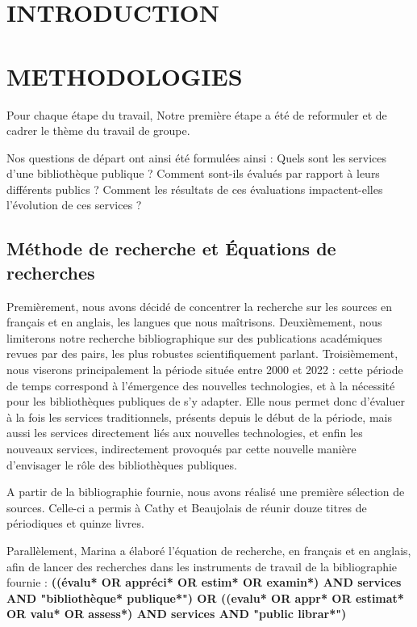 \documentclass[french,a4paper,12pt]{article}
\begin{document}
 \begin{center}
 \tableofcontents
 \end{center}
\newpage



\section{INTRODUCTION}




\newpage
\section{METHODOLOGIES}
Pour chaque étape du travail,  
Notre première étape a été de reformuler et de cadrer le thème du travail de groupe. 

\quad Nos questions de départ ont ainsi été formulées ainsi : Quels sont les services d'une bibliothèque publique ? Comment sont-ils évalués par rapport à leurs différents publics ? Comment les résultats de ces évaluations impactent-elles l'évolution de ces services ?\\
 
\subsection{Méthode de recherche​ et Équations de recherches}
\quad Premièrement, nous avons décidé de concentrer la recherche sur les sources en français et en anglais, les langues que nous maîtrisons. Deuxièmement, nous limiterons notre recherche bibliographique sur des publications académiques revues par des pairs, les plus robustes scientifiquement parlant. Troisièmement, nous viserons principalement la période située entre 2000 et 2022 : cette période de temps correspond à l’émergence des nouvelles technologies, et à la nécessité pour les bibliothèques publiques de s’y adapter. Elle nous permet donc d’évaluer à la fois les services traditionnels, présents depuis le début de la période, mais aussi les services directement liés aux nouvelles technologies, et enfin les nouveaux services, indirectement provoqués par cette nouvelle manière d'envisager le rôle des bibliothèques publiques. 

A partir de la bibliographie fournie, nous avons réalisé une première sélection de sources. Celle-ci a permis à Cathy et Beaujolais de réunir douze titres de périodiques et quinze livres. 

Parallèlement, Marina a élaboré l’équation de recherche, en français et en anglais, afin de lancer des recherches dans les instruments de travail de la bibliographie fournie :\textbf{ ((évalu* OR appréci* OR estim* OR examin*) AND services AND "bibliothèque* publique*") OR ((evalu* OR appr* OR estimat* OR valu* OR assess*) AND services AND "public librar*") }
\end{document}
